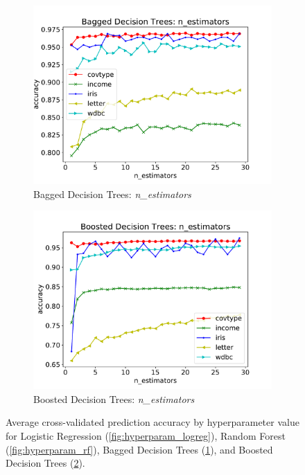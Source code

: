\documentclass[twoside,11pt]{article}
\begin{document}
\begin{figure}[h]
\begin{framed}
					\begin{subfigure}[b]{.49\linewidth}
						\includegraphics[width=\linewidth]{bagdt_hyperparam}
						\caption{Bagged Decision Trees: \textit{n\_estimators}}
						\label{fig:hyperparam_bagdt}
					\end{subfigure}
					\begin{subfigure}[b]{.49\linewidth}
						\includegraphics[width=\linewidth]{bstdt_hyperparam}
						\caption{Boosted Decision Trees: \textit{n\_estimators}}
						\label{fig:hyperparam_bstdt}
					\end{subfigure}
					
					\caption{Average cross-validated prediction accuracy by hyperparameter value for Logistic Regression (\ref{fig:hyperparam_logreg}), Random Forest (\ref{fig:hyperparam_rf}), Bagged Decision Trees (\ref{fig:hyperparam_bagdt}), and Boosted Decision Trees (\ref{fig:hyperparam_bstdt}).}
					\label{fig:hyperparam_others}
				\end{framed}
			\end{figure}
		
\end{document}
